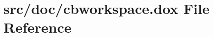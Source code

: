 \hypertarget{cbworkspace_8dox}{\section{src/doc/cbworkspace.dox File Reference}
\label{cbworkspace_8dox}
}
